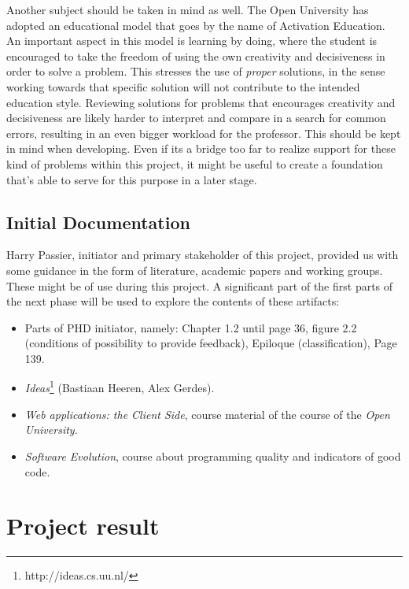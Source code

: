 \documentclass{article}
\begin{document}
Another subject should be taken in mind as well. The Open University has
adopted an educational model that goes by the name of Activation Education. An
important aspect in this model is learning by doing, where the student is
encouraged to take the freedom of using the own creativity and decisiveness in
order to solve a problem. This stresses the use of {\em proper} solutions, in
the sense working towards that specific solution will not contribute to the
intended education style. Reviewing solutions for problems that encourages
creativity and decisiveness are likely harder to interpret and compare in a
search for common errors, resulting in an even bigger workload for the
professor. This should be kept in mind when developing. Even if its a bridge
too far to realize support for these kind of problems within this project, it
might be useful to create a foundation that's able to serve for this purpose in
a later stage.

\subsection{Initial Documentation}

Harry Passier, initiator and primary stakeholder of this project, provided us 
with some guidance in the form of literature, academic papers and working 
groups. These might be of use during this project. A significant part of the 
first parts of the next phase will be used to explore the contents of these 
artifacts:
\begin{itemize}
  \item Parts of PHD initiator, namely: Chapter 1.2 until page 36, figure 2.2
    (conditions of possibility to provide feedback), Epiloque (classification),
    Page 139.
  \item {\em Ideas}\footnote{http://ideas.cs.uu.nl/} (Bastiaan Heeren, Alex
    Gerdes).
  \item {\em Web applications: the Client Side}, course material of the course
    of the {\em Open University}.
  \item {\em Software Evolution}, course about programming quality and
    indicators of good code.
\end{itemize}

\section{Project result}
\end{document}
